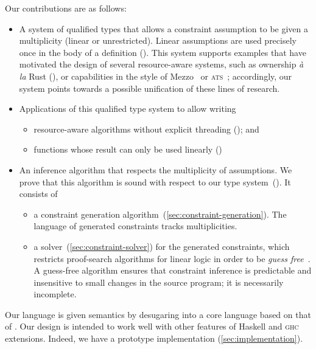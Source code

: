 \documentclass[acmsmall,usenames,dvipsnames,natbib=false,acmthm=false,screen]{acmart}
\theoremstyle{acmplain}
\theoremstyle{acmdefinition}
\begin{document}
Our contributions are as follows:
\begin{itemize}
\item A system of qualified types that allows a constraint assumption
  to be given a multiplicity (linear or unrestricted). Linear assumptions are used precisely
  once in the body of a definition
  (). This system supports examples
  that have motivated the design of several resource-aware systems,
  such as ownership \textit{à la} Rust (), or
  capabilities in the style of Mezzo~\cite{mezzo-permissions} or
  \textsc{ats}~\cite{AtsLinearViews}; accordingly, our system points
  towards a possible unification of these lines of research.

\item Applications of this qualified type system to allow writing
  \begin{itemize}
  \item resource-aware algorithms without explicit threading (); and
  \item functions whose result can only be used linearly ()
  \end{itemize}

\item An inference algorithm that respects the multiplicity of
  assumptions. We prove that this algorithm is sound with respect to
  our type system~(). It consists of
  \begin{itemize}
  \item a constraint generation
    algorithm~(\cref{sec:constraint-generation}). The language of
    generated constraints tracks multiplicities.
  \item a solver~(\cref{sec:constraint-solver}) for the generated
    constraints, which restricts proof-search algorithms for linear
    logic in order to be \emph{guess
      free}~\cite[Section~6.4]{OutsideIn}. A guess-free algorithm
    ensures that constraint inference is predictable and insensitive
    to small changes in the source program; it is necessarily
    incomplete.
  \end{itemize}
\end{itemize}
%
Our language is given semantics by desugaring into a core language based
on that of \citet{LinearHaskell}.
Our design is intended to work well with other features of Haskell and
\textsc{ghc} extensions. Indeed, we have a prototype implementation (\cref{sec:implementation}).
\end{document}
